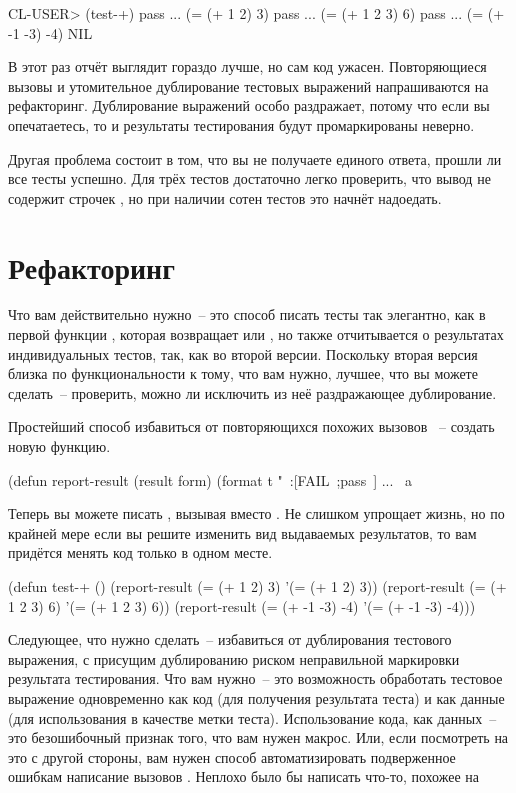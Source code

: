 \begin{myverb}
CL-USER> (test-+)
pass ... (= (+ 1 2) 3)
pass ... (= (+ 1 2 3) 6)
pass ... (= (+ -1 -3) -4)
NIL
\end{myverb}

В этот раз отчёт выглядит гораздо лучше, но сам код ужасен. Повторяющиеся вызовы
 и утомительное дублирование тестовых выражений напрашиваются на
рефакторинг. Дублирование выражений особо раздражает, потому что если вы опечатаетесь, то
и результаты тестирования будут промаркированы неверно.

Другая проблема состоит в том, что вы не получаете единого ответа, прошли ли все
тесты успешно. Для трёх тестов достаточно легко проверить, что вывод не содержит
строчек , но при наличии сотен тестов это начнёт надоедать.

\section{Рефакторинг}

Что вам действительно нужно~-- это способ писать тесты так элегантно, как в первой
функции , которая возвращает  или , но также отчитывается о
результатах индивидуальных тестов, так, как во второй версии. Поскольку вторая версия
близка по функциональности к тому, что вам нужно, лучшее, что вы можете сделать~--
проверить, можно ли исключить из неё раздражающее дублирование.

Простейший способ избавиться от повторяющихся похожих вызовов ~-- создать
новую функцию.

\begin{myverb}
(defun report-result (result form)
  (format t "~:[FAIL~;pass~] ... ~a~%
\end{myverb}

Теперь вы можете писать , вызывая  вместо
. Не слишком упрощает жизнь, но по крайней мере если вы решите изменить вид
выдаваемых результатов, то вам придётся менять код только в одном месте.

\begin{myverb}
(defun test-+ ()
  (report-result (= (+ 1 2) 3) '(= (+ 1 2) 3))
  (report-result (= (+ 1 2 3) 6) '(= (+ 1 2 3) 6))
  (report-result (= (+ -1 -3) -4) '(= (+ -1 -3) -4)))
\end{myverb}

Следующее, что нужно сделать~-- избавиться от дублирования тестового выражения, с
присущим дублированию риском неправильной маркировки результата тестирования. Что вам
нужно~-- это возможность обработать тестовое выражение одновременно как код (для
получения результата теста) и как данные (для использования в качестве метки
теста). Использование кода, как данных~-- это безошибочный признак того, что вам нужен
макрос. Или, если посмотреть на это с другой стороны, вам нужен способ автоматизировать
подверженное ошибкам написание вызовов . Неплохо было бы написать
что-то, похожее на

